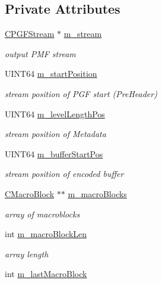\subsection*{Private Attributes}
\begin{DoxyCompactItemize}
\item 
\mbox{\hyperlink{classCPGFStream}{C\+P\+G\+F\+Stream}} $\ast$ \mbox{\hyperlink{classCEncoder_ad01ad5ea3003064b00516dad191d3499}{m\+\_\+stream}}
\begin{DoxyCompactList}\small\item\em output P\+MF stream \end{DoxyCompactList}\item 
U\+I\+N\+T64 \mbox{\hyperlink{classCEncoder_a32012be0814bbc611963517e482d1111}{m\+\_\+start\+Position}}
\begin{DoxyCompactList}\small\item\em stream position of P\+GF start (Pre\+Header) \end{DoxyCompactList}\item 
U\+I\+N\+T64 \mbox{\hyperlink{classCEncoder_a5409bc51f3d922d43b5bcad3b8f2c8aa}{m\+\_\+level\+Length\+Pos}}
\begin{DoxyCompactList}\small\item\em stream position of Metadata \end{DoxyCompactList}\item 
U\+I\+N\+T64 \mbox{\hyperlink{classCEncoder_a17309ba6d30988bf1e6d02ea51a55825}{m\+\_\+buffer\+Start\+Pos}}
\begin{DoxyCompactList}\small\item\em stream position of encoded buffer \end{DoxyCompactList}\item 
\mbox{\hyperlink{classCEncoder_1_1CMacroBlock}{C\+Macro\+Block}} $\ast$$\ast$ \mbox{\hyperlink{classCEncoder_a6f4684ae62c14fcf22ff29e7ac8f5bc2}{m\+\_\+macro\+Blocks}}
\begin{DoxyCompactList}\small\item\em array of macroblocks \end{DoxyCompactList}\item 
int \mbox{\hyperlink{classCEncoder_aeed23492e6a3d093c919708da3cc04d2}{m\+\_\+macro\+Block\+Len}}
\begin{DoxyCompactList}\small\item\em array length \end{DoxyCompactList}\item 
int \mbox{\hyperlink{classCEncoder_aac446c96d95a90bb005019aef2d18284}{m\+\_\+last\+Macro\+Block}}
$$
\end{DoxyCompactItemize}
